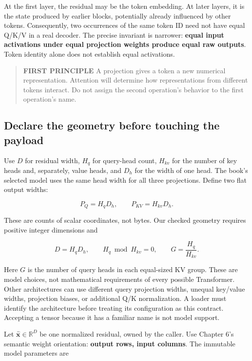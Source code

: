 \documentclass[
  10pt,
]{article}
\begin{document}
At the first layer, the residual may be the token embedding. At later
layers, it is the state produced by earlier blocks, potentially already
influenced by other tokens. Consequently, two occurrences of the same
token ID need not have equal Q/K/V in a real decoder. The precise
invariant is narrower: \textbf{equal input activations under equal
projection weights produce equal raw outputs}. Token identity alone does
not establish equal activations.

\begin{quote}
\textbf{FIRST PRINCIPLE} A projection gives a token a new numerical
representation. Attention will determine how representations from
different tokens interact. Do not assign the second operation's behavior
to the first operation's name.
\end{quote}

\subsection{Declare the geometry before touching the
payload}\label{declare-the-geometry-before-touching-the-payload}

Use \(D\) for residual width, \(H_q\) for query-head count, \(H_{kv}\)
for the number of key heads and, separately, value heads, and \(D_h\)
for the width of one head. The book's selected model uses the same head
width for all three projections. Define two flat output widths:

\[
P_Q=H_qD_h,\qquad P_{KV}=H_{kv}D_h.
\]

These are counts of scalar coordinates, not bytes. Our checked geometry
requires positive integer dimensions and

\[
D=H_qD_h,\qquad H_q\bmod H_{kv}=0,\qquad G=\frac{H_q}{H_{kv}}.
\]

Here \(G\) is the number of query heads in each equal-sized KV group.
These are model choices, not mathematical requirements of every possible
Transformer. Other architectures can use different query projection
widths, unequal key/value widths, projection biases, or additional Q/K
normalization. A loader must identify the architecture before treating
its configuration as this contract. Accepting a tensor because it has a
familiar name is not model support.

Let \(\widehat{\mathbf{x}}\in\mathbb{R}^{D}\) be one normalized
residual, owned by the caller. Use Chapter 6's semantic weight
orientation: \textbf{output rows, input columns}. The immutable model
parameters are
\end{document}
